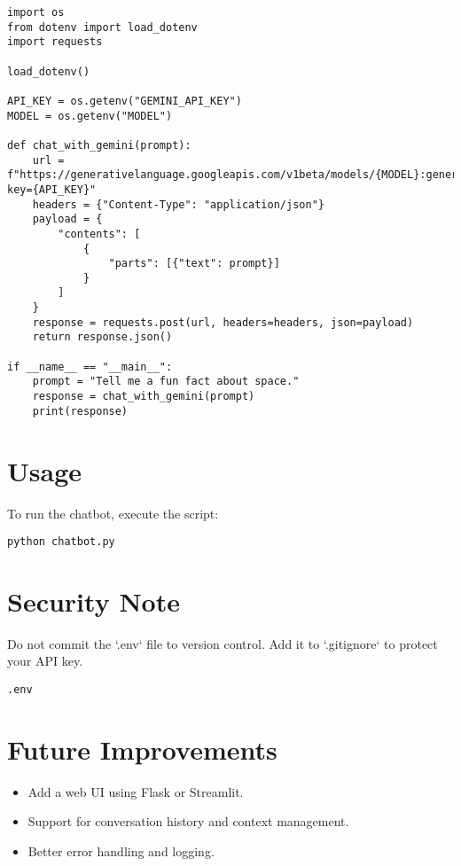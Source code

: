 \documentclass[12pt]{article}
\begin{document}
\begin{verbatim}
import os
from dotenv import load_dotenv
import requests

load_dotenv()

API_KEY = os.getenv("GEMINI_API_KEY")
MODEL = os.getenv("MODEL")

def chat_with_gemini(prompt):
    url = f"https://generativelanguage.googleapis.com/v1beta/models/{MODEL}:generateContent?key={API_KEY}"
    headers = {"Content-Type": "application/json"}
    payload = {
        "contents": [
            {
                "parts": [{"text": prompt}]
            }
        ]
    }
    response = requests.post(url, headers=headers, json=payload)
    return response.json()

if __name__ == "__main__":
    prompt = "Tell me a fun fact about space."
    response = chat_with_gemini(prompt)
    print(response)
\end{verbatim}

\section*{Usage}
To run the chatbot, execute the script:
\begin{verbatim}
python chatbot.py
\end{verbatim}

\section*{Security Note}
Do not commit the `.env` file to version control. Add it to `.gitignore` to protect your API key.

\begin{tcolorbox}[colback=red!5!white, colframe=red!75!black, title=Add to .gitignore]
\begin{verbatim}
.env
\end{verbatim}
\end{tcolorbox}

\section*{Future Improvements}
\begin{itemize}
  \item Add a web UI using Flask or Streamlit.
  \item Support for conversation history and context management.
  \item Better error handling and logging.
\end{itemize}
\end{document}
